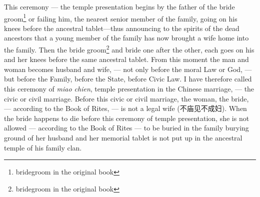 This ceremony --- the temple presentation begins by the father of the bride groom\footnote{bridegroom in the original book} or failing him, the nearest senior member of the family, going on his knees before the ancestral tablet---thus announcing to the spirits of the dead ancestors that a young member of the family has now brought a wife home into the family.
Then the bride groom\footnote{bridegroom in the original book} and bride one after the other, each goes on his and her knees before the same ancestral tablet.
From this moment the man and woman becomes husband and wife, --- not only before the moral Law or God, --- but before the Family, before the State, before Civic Law.
I have therefore called this ceremony of \emph{miao chien}, temple presentation in the Chinese marriage, --- the civic or civil marriage.
Before this civic or civil marriage, the woman, the bride, --- according to the Book of Rites, --- is not a legal wife (不庙见不成妇).
When the bride happens to die before this ceremony of temple presentation, she is not allowed --- according to the Book of Rites --- to be buried in the family burying ground of her husband and her memorial tablet is not put up in the ancestral temple of his family clan.

